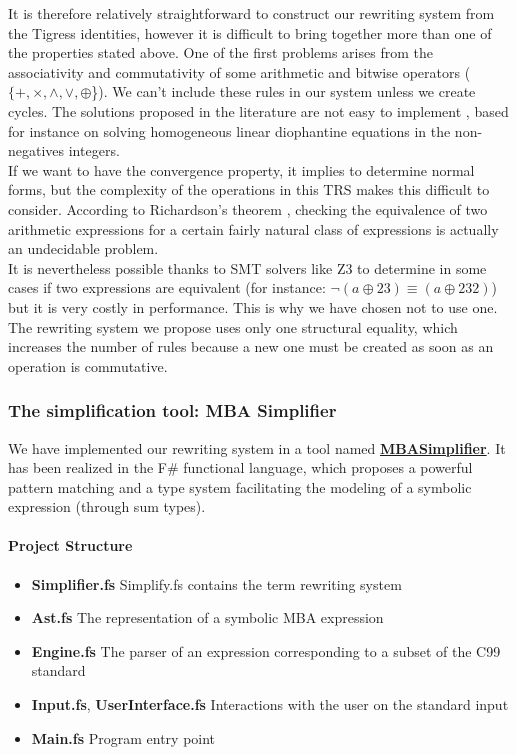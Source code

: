 \documentclass{projectreport}
\begin{document}
It is therefore relatively straightforward to construct our rewriting system from the Tigress identities, however it is difficult to bring together more than one of the properties stated above. One of the first problems arises from the associativity and commutativity of some arithmetic and bitwise operators ($\{+, \times, \land, \lor, \oplus$\}). We can't include these rules in our system unless we create cycles. The solutions proposed in the literature are not easy to implement \cite{termrewriting}, based for instance on solving homogeneous linear diophantine equations in the non-negatives integers.  \\
If we want to have the convergence property, it implies to determine normal forms, but the complexity of the operations in this TRS makes this difficult to consider. According to Richardson's theorem \cite{decidability}, checking the equivalence of two arithmetic expressions  for a certain fairly natural class of expressions is actually an undecidable problem. \\
It is nevertheless possible thanks to \textsf{SMT} solvers like Z3 \cite{z3solver} to determine in some cases if two expressions are equivalent (for instance: $\neg (a \oplus 23) \equiv (a \oplus 232)$) but it is very costly in performance. This is why we have chosen not to use one. \\
The rewriting system we propose uses only one structural equality, which increases the number of rules because a new one must be created as soon as an operation is commutative. 

\subsubsection{The simplification tool: MBA Simplifier}
We have implemented our rewriting system in a tool named \href{https://github.com/adutilleul/tigress-deobfuscation}{\textbf{MBASimplifier}}.  It has been realized in the F\# functional language, which proposes a powerful pattern matching and a type system facilitating the modeling of a symbolic expression (through sum types).

\paragraph{Project Structure} 

\begin{itemize}
    \item \textbf{Simplifier.fs} Simplify.fs contains the term rewriting system 
    \item \textbf{Ast.fs} The representation of a symbolic MBA expression 
    \item \textbf{Engine.fs} The parser of an expression corresponding to a subset of the C99 standard
    \item \textbf{Input.fs}, \textbf{UserInterface.fs} Interactions with the user on the standard input 
    \item \textbf{Main.fs} Program entry point
\end{itemize}
\end{document}
